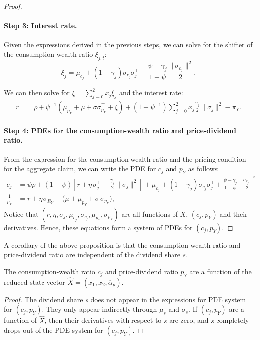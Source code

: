 \begin{proof}
\paragraph{Step 3: Interest rate.}
Given the expressions derived in the previous steps, we can solve for the shifter of the consumption-wealth ratio $\xi_{j,t}$:
\begin{equation}
    \xi_{j} = \mu_{c_j} 
    + (1-\gamma_j) \sigma_{c_j} \sigma_{j}^\top 
    + \frac{\psi - \gamma_j}{1-\psi} \frac{\|\sigma_{c_j}\|^2}{2}.
\end{equation}

We can then solve for $\xi = \sum_{j=0}^2 x_{j} \xi_{j}$ and the interest rate:
\begin{align}
    r &= \rho 
    + \psi^{-1} \left(\mu_{p_Y} + \mu + \sigma \sigma_{p_Y}^\top + \xi \right)
    + (1-\psi^{-1}) \sum_{j=0}^2 x_{j} 
        \frac{\gamma_j }{2} \|\sigma_{j}\|^2
    - \pi_{Y}.
\end{align}

\paragraph{Step 4: PDEs for the consumption-wealth ratio and price-dividend ratio.}
From the expression for the consumption-wealth ratio and the pricing condition for the aggregate claim, we can write the PDE for $c_j$ and $p_Y$ as follows:
\begin{align}
        c_{j} &= \psi \rho 
        + (1-\psi) \left[ r + \eta\,\sigma_{j}^\top - \frac{\gamma_j}{2} \|\sigma_{j}\|^2 \right] 
        +  \mu_{c_j} 
        + (1-\gamma_j) \sigma_{c_j} \sigma_{j}^\top 
        + \frac{\psi - \gamma_j}{1-\psi} \frac{\|\sigma_{c_j}\|^2}{2}\\
        \frac{1}{p_{Y}} &= r + \eta\,\sigma_{R_Y}^\top - \big(\mu + \mu_{p_Y} + \sigma \, \sigma_{p_Y}^\top\big),        
\end{align}
Notice that $(r, \eta, \sigma_{j}, \mu_{c_j}, \sigma_{c_j}, \mu_{p_Y}, \sigma_{p_Y})$ are all functions of $X$, $(c_j,p_Y)$ and their derivatives.
Hence, these equations form a system of PDEs for $(c_j,p_Y)$.
\end{proof}

A corollary of the above proposition is that the consumption-wealth ratio and price-dividend ratio are independent of the dividend share $s$.
\begin{cor}
    The consumption-wealth ratio $c_j$ and price-dividend ratio $p_Y$ are a function of the reduced state vector $\hat{X} = (x_1,x_2,\overline{\alpha}_p)$.
\end{cor}
\begin{proof}
    The dividend share $s$ does not appear in the expressions for PDE system for $(c_j,p_Y)$.
    They only appear indirectly through $\mu_{s}$ and $\sigma_{s}$.
    If $(c_j,p_Y)$ are a function of $\hat{X}$, then their derivatives with respect to $s$ are zero, and $s$ completely drops out of the PDE system for $(c_j,p_Y)$.
\end{proof}

